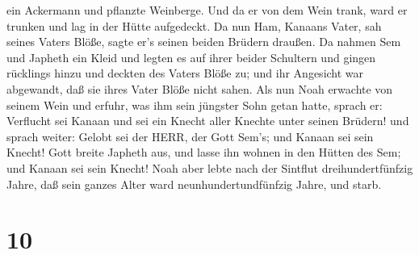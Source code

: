 ein Ackermann und pflanzte Weinberge.  Und da er von dem
Wein trank, ward er trunken und lag in der Hütte aufgedeckt.
 Da nun Ham, Kanaans Vater, sah seines Vaters Blöße, sagte
er's seinen beiden Brüdern draußen.  Da nahmen Sem und
Japheth ein Kleid und legten es auf ihrer beider Schultern und gingen
rücklings hinzu und deckten des Vaters Blöße zu; und ihr Angesicht war
abgewandt, daß sie ihres Vater Blöße nicht sahen.  Als nun
Noah erwachte von seinem Wein und erfuhr, was ihm sein jüngster Sohn
getan hatte,  sprach er: Verflucht sei Kanaan und sei ein
Knecht aller Knechte unter seinen Brüdern!  und sprach
weiter: Gelobt sei der HERR, der Gott Sem's; und Kanaan sei sein Knecht!
 Gott breite Japheth aus, und lasse ihn wohnen in den
Hütten des Sem; und Kanaan sei sein Knecht!  Noah aber
lebte nach der Sintflut dreihundertfünfzig Jahre,  daß sein
ganzes Alter ward neunhundertundfünfzig Jahre, und starb.

\hypertarget{section-9}{%
\section{10}\label{section-9}}


